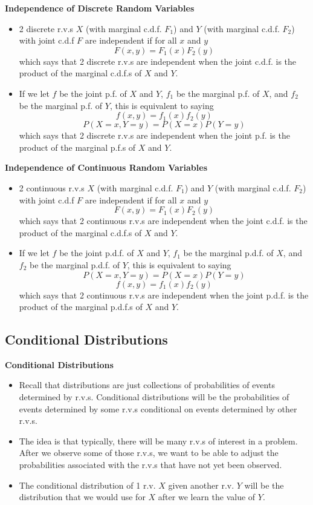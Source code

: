 \documentclass[11pt]{article}
\begin{document}
\textbf{Independence of Discrete Random Variables}
\begin{itemize}
    \item 2 discrete r.v.s $X$ (with marginal c.d.f. $F_1$) and $Y$ (with marginal c.d.f. 
    $F_2$) with joint c.d.f $F$ are independent if for all $x$ and $y$ 
    \[F(x,y) = F_1(x)F_2(y)\]
    which says that 2 discrete r.v.s are independent when the joint c.d.f. is the product of 
    the marginal c.d.f.s of $X$ and $Y$.
    \item If we let $f$ be the joint p.f. of $X$ and $Y$, $f_1$ be the marginal p.f. of $X$, 
    and $f_2$ be the marginal p.f. of $Y$, this is equivalent to saying
    \[ f(x,y) = f_1(x)f_2(y) \]
    \[ P(X=x, Y=y) = P(X=x)P(Y=y) \]
    which says that 2 discrete r.v.s are independent when the joint p.f. is the product of the 
    marginal p.f.s of $X$ and $Y$.
\end{itemize}

\textbf{Independence of Continuous Random Variables}
\begin{itemize}
    \item 2 continuous r.v.s $X$ (with marginal c.d.f. $F_1$) and $Y$ (with marginal c.d.f. 
    $F_2$) with joint c.d.f $F$ are independent if for all $x$ and $y$ 
    \[F(x,y) = F_1(x)F_2(y)\]
    which says that 2 continuous r.v.s are independent when the joint c.d.f. is the product of 
    the marginal c.d.f.s of $X$ and $Y$.
    \item If we let $f$ be the joint p.d.f. of $X$ and $Y$, $f_1$ be the marginal p.d.f. of $X$, 
    and $f_2$ be the marginal p.d.f. of $Y$, this is equivalent to saying
    \[ P(X=x, Y=y) = P(X=x)P(Y=y)\]
    \[ f(x,y) = f_1(x)f_2(y)\]
    which says that 2 continuous r.v.s are independent when the joint p.d.f. is the product of 
    the marginal p.d.f.s of $X$ and $Y$.
\end{itemize}

\subsection{Conditional Distributions}

\textbf{Conditional Distributions}
\begin{itemize}
    \item Recall that distributions are just collections of probabilities of events determined
    by r.v.s. Conditional distributions will be the probabilities of events determined by some 
    r.v.s conditional on events determined by other r.v.s.
    \item The idea is that typically, there will be many r.v.s of interest in a problem. After 
    we observe some of those r.v.s, we want to be able to adjust the probabilities associated 
    with the r.v.s that have not yet been observed. 
    \item The conditional distribution of 1 r.v. $X$ given another r.v. $Y$ will be the 
    distribution that we would use for $X$ after we learn the value of $Y$.
\end{itemize}
\end{document}
